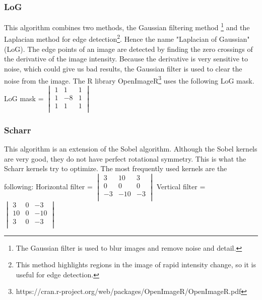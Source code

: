 \documentclass[12pt]{article}
\begin{document}
\subsubsection{LoG}
This algorithm combines two methods, the Gaussian filtering method \footnote{The Gaussian filter is used to blur images and remove noise and detail.} and the Laplacian method for edge detection\footnote{This method highlights regions in the image of rapid intensity change, so it is useful for edge detection.}. Hence the name "Laplacian of Gaussian" (LoG).
The edge points of an image are detected by finding the zero crossings of the  derivative of the image intensity. Because the  derivative is very sensitive to noise, which could give us bad results, the Gaussian filter is used to clear the noise from the image. 
\newline
\newline
The R library OpenImageR\footnote{https://cran.r-project.org/web/packages/OpenImageR/OpenImageR.pdf} uses the following LoG mask.
\newline
\newline
LoG mask = $\begin{vmatrix}
	1 & 1 & 1\\
	1 & -8 & 1\\
	1 & 1 & 1\\
\end{vmatrix}$

\subsubsection{Scharr}
This algorithm is an extension of the Sobel algorithm. Although the Sobel kernels are very good, they do not have perfect rotational symmetry. This is what the Scharr kernels try to optimize.
\newline
\newline
The most frequently used kernels are the following:
\newline
\newline
Horizontal filter = $\begin{vmatrix}
	3 & 10 & 3\\
	0 & 0 & 0\\
	-3 & -10 & -3\\
\end{vmatrix}$\hspace{11mm}
Vertical filter = $\begin{vmatrix}
	3 & 0 & -3\\
	10 & 0 & -10\\
	3 & 0 & -3\\
\end{vmatrix}$\hspace{5mm}
\end{document}
